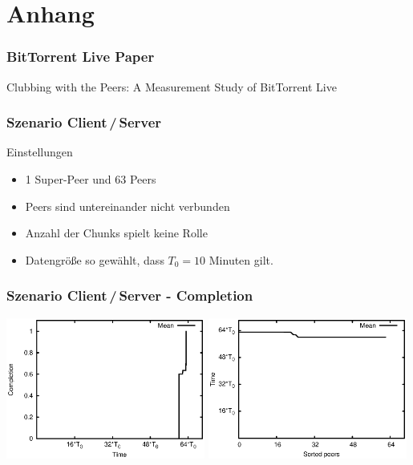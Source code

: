 
\section{Anhang}

\begin{frame}
  \frametitle{BitTorrent Live Paper}
  Clubbing with the Peers: A Measurement Study of BitTorrent Live
\end{frame}


\begin{frame}
  \frametitle{Szenario Client\,/\,Server}
  \begin{block}{Einstellungen}
    \begin{itemize}  
      \item 1 Super-Peer und 63 Peers
      \vspace{2mm}
      \item Peers sind untereinander nicht verbunden
      \vspace{2mm}
      \item Anzahl der Chunks spielt keine Rolle
      \vspace{2mm}
      \item Datengröße so gewählt, dass $T_0=10$ Minuten gilt.
    \end{itemize}   
  \end{block}
\end{frame}

\begin{frame}
  \frametitle{Szenario Client\,/\,Server - Completion}
  \begin{center}
    \includegraphics[width=0.49\textwidth]{fig/plots/scenario_2_seq/plots/GeneratedMeanChunkCompletion.csv.eps}
    \hfill
    \includegraphics[width=0.49\textwidth]{fig/plots/scenario_2_seq/plots/GeneratedMeanSortedChunkCompletion.csv.eps}
  \end{center}
\end{frame}


